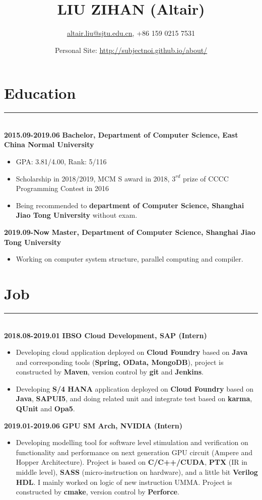 \documentclass[a4paper]{article}
\title{LIU ZIHAN (Altair)}
\author{\url{altair.liu@sjtu.edu.cn}, +86 159 0215 7531}
\date{Personal Site: \url{http://subjectnoi.github.io/about/}}
\begin{document}
		\maketitle
		\section*{Education}
		\rule[1pt]{18cm}{0.01em}\\
		\textbf{2015.09-2019.06} \hfill \textbf{Bachelor, Department of Computer Science, East China Normal University}
		\begin{itemize}
		\item GPA: 3.81/4.00, Rank: 5/116
		\item Scholarship in 2018/2019, MCM S award in 2018, $ 3^{rd} $ prize of CCCC Programming Contest in 2016
		\item Being recommended to \textbf{department of Computer Science, Shanghai Jiao Tong University} without exam.
		\end{itemize}
		\textbf{2019.09-Now} \hfill \textbf{Master, Department of Computer Science, Shanghai Jiao Tong University}
		\begin{itemize}
		\item Working on computer system structure, parallel computing and compiler.
		\end{itemize}
		\section*{Job}
		\rule[1pt]{18cm}{0.01em}\\
		\textbf{2018.08-2019.01} \hfill \textbf{IBSO Cloud Development, SAP (Intern)}
		\begin{itemize}
		\item Developing cloud application deployed on \textbf{Cloud Foundry} based on \textbf{Java} and corresponding tools (\textbf{Spring, OData, MongoDB}), project is constructed by \textbf{Maven}, version control by \textbf{git} and \textbf{Jenkins}.
		\item Developing \textbf{S/4 HANA} application deployed on \textbf{Cloud Foundry} based on \textbf{Java}, \textbf{SAPUI5}, and doing related unit and integrate test based on \textbf{karma}, \textbf{QUnit} and \textbf{Opa5}.
		\end{itemize}
		\textbf{2019.01-2019.06} \hfill \textbf{GPU SM Arch, NVIDIA (Intern)}
		\begin{itemize}
		\item Developing modelling tool for software level stimulation and verification on functionality and performance on next generation GPU circuit (Ampere and Hopper Architecture). Project is based on \textbf{C/C++/CUDA}, \textbf{PTX} (IR in middle level), \textbf{SASS} (micro-instruction on hardware), and a little bit \textbf{Verilog HDL}. I mainly worked on logic of new instruction UMMA. Project is constructed by \textbf{cmake}, version control by \textbf{Perforce}.
		\end{itemize}
\end{document}
